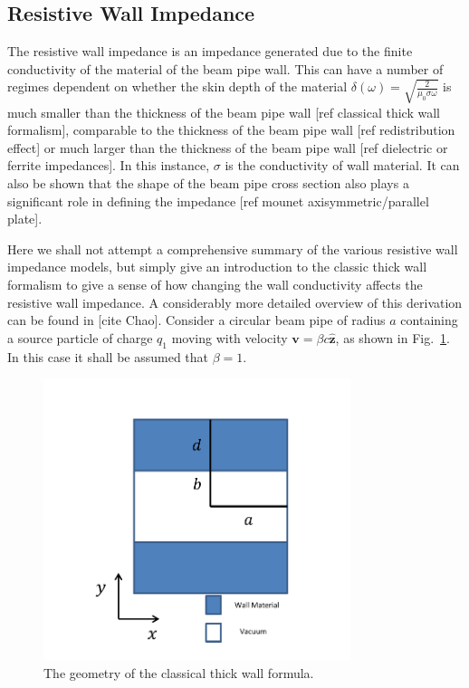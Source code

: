 \subsection{Resistive Wall Impedance}
\label{sec:res_wall_imp}

The resistive wall impedance is an impedance generated due to the finite conductivity of the material of the beam pipe wall. This can have a number of regimes dependent on whether the skin depth of the material $\delta \left( \omega \right) = \sqrt{\frac{2}{\mu_{0} \sigma \omega}}$ is much smaller than the thickness of the beam pipe wall [ref classical thick wall formalism], comparable to the thickness of the beam pipe wall [ref redistribution effect] or much larger than the thickness of the beam pipe wall [ref dielectric or ferrite impedances]. In this instance, $\sigma$ is the conductivity of wall material. It can also be shown that the shape of the beam pipe cross section also plays a significant role in defining the impedance [ref mounet axisymmetric/parallel plate].

Here we shall not attempt a comprehensive summary of the various resistive wall impedance models, but simply give an introduction to the classic thick wall formalism to give a sense of how changing the wall conductivity affects the resistive wall impedance. A considerably more detailed overview of this derivation can be found in [cite Chao]. Consider a circular beam pipe of radius $a$ containing a source particle of charge $q_{1}$ moving with velocity $\mathbf{v} = \beta c \mathbf{\hat{z}}$, as shown in Fig.~\ref{fig:res_wall_diagram}. In this case it shall be assumed that $\beta = 1$.

\begin{figure}
\begin{center}
\includegraphics[width=0.8\textwidth]{Wakefields_and_Impedances/figures/reWallGeo.pdf}
\end{center}
\caption{The geometry of the classical thick wall formula.}
\label{fig:res_wall_diagram}
\end{figure}

